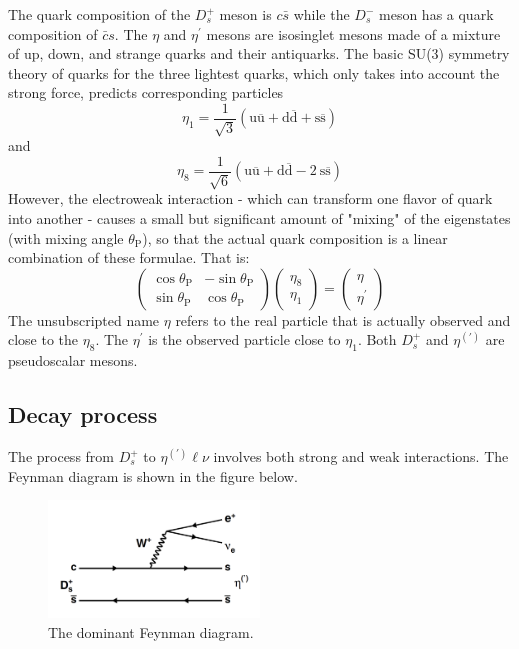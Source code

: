 The quark composition of the $D_{s}^{+}$ meson is $c\bar{s}$ while the $D_{s}^{-}$ meson has a quark composition of $\bar{c}s$. The $\eta$ and $\eta^{\prime}$ mesons are isosinglet mesons made of a mixture of up, down, and strange quarks and their antiquarks. The basic SU(3) symmetry theory of quarks for the three lightest quarks, which only takes into account the strong force, predicts corresponding particles
\begin{equation}
    \eta_1=\frac{1}{\sqrt{3}}(\mathrm{u} \overline{\mathrm{u}}+\mathrm{d} \overline{\mathrm{d}}+\mathrm{s} \overline{\mathrm{s}})
\end{equation}
and
\begin{equation}
    \eta_8=\frac{1}{\sqrt{6}}(\mathrm{u} \overline{\mathrm{u}}+\mathrm{d} \overline{\mathrm{d}}-2 \mathrm{~s} \overline{\mathrm{s}})
\end{equation}
However, the electroweak interaction - which can transform one flavor of quark into another - causes a small but significant amount of "mixing" of the eigenstates (with mixing angle $\theta_{\mathrm{P}}$), so that the actual quark composition is a linear combination of these formulae. That is:
\begin{equation}
    \left(\begin{array}{cr}
        \cos \theta_{\mathrm{P}} & -\sin \theta_{\mathrm{P}} \\
        \sin \theta_{\mathrm{P}} & \cos \theta_{\mathrm{P}}
    \end{array}\right)\left(\begin{array}{l}
        \eta_8 \\
        \eta_1
    \end{array}\right)=\left(\begin{array}{c}
        \eta \\
        \eta^{\prime}
    \end{array}\right)
\end{equation}
The unsubscripted name $\eta$ refers to the real particle that is actually observed and close to the $\eta_8$. The $\eta^{\prime}$ is the observed particle close to $\eta_1$. Both $D_{s}^{+}$ and $\eta^{(\prime)}$ are pseudoscalar mesons.



\subsection{Decay process}
The process from \( D_{s}^{+} \) to \( \eta^{(\prime)} \ell \nu \) involves both strong and weak interactions. The Feynman diagram is shown in the figure below.


\begin{figure}[!hpt]\centering
    \includegraphics[width=0.5\textwidth]{image/diagram.png}
    \caption{The dominant Feynman diagram.}
    \label{fig:diagram1}
\end{figure}


